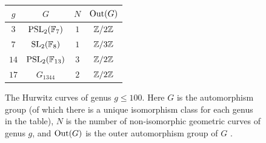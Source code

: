 \documentclass[main.tex]{subfiles}
\begin{document}
\begin{figure}
\begin{center}
    \begin{tabular}{c|c|c|c}
        $g$ & $G$ & $N$ & $\operatorname{\mathrm{Out}}(G)$ \\
        \hline
         $3$ & $\mathrm{PSL}_2(\mathbb{F}_7)$ & $1$ & $\mathbb{Z} / 2 \mathbb{Z}$
         \\
         $7$ & $\mathrm{SL}_2(\mathbb{F}_8)$ & $1$ & $\mathbb{Z} / 3 \mathbb{Z}$
         \\
         $14$ & $\mathrm{PSL}_2(\mathbb{F}_{13})$ & $3$ & $\mathbb{Z} / 2 \mathbb{Z}$
         \\
         $17$ & $G_{1344}$ & $2$ & $\mathbb{Z} / 2 \mathbb{Z}$
    \end{tabular}
\end{center}
    \caption{The Hurwitz curves of genus $g \le 100$. Here $G$ is the automorphism group (of which there is a unique isomorphism class for each genus in the table), $N$ is the number of non-isomorphic geometric curves of genus $g$, and $\operatorname{\mathrm{Out}}(G)$ is the outer automorphism group of $G$ \cite{Conder:survey, Conder:update}.}
    \label{table:low_genus}
\end{figure}
\end{document}
